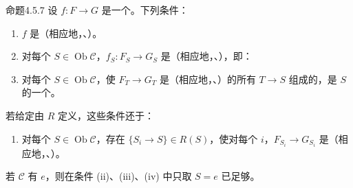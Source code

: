 \begin{SGAresult}{命题}{4.5.7}
设 $f:F\to G$ 是一个。下列条件：
\begin{enumerate}
\item[(i)] $f$ 是（相应地，、）。
\item[(ii)] 对每个 $S\in\operatorname{Ob}\mathcal C$，$f_S:F_S\to G_S$ 是（相应地，、），即：
\item[(iii)] 对每个 $S\in\operatorname{Ob}\mathcal C$，使 $F_T\to G_T$ 是（相应地，、）的所有 $T\to S$ 组成的，是 $S$ 的一个。
\end{enumerate}
若给定由 $R$ 定义，这些条件还于：
\begin{enumerate}
\item[(iv)] 对每个 $S\in\operatorname{Ob}\mathcal C$，存在 $\{S_i\to S\}\in R(S)$，使对每个 $i$，$F_{S_i}\to G_{S_i}$ 是（相应地，、）。
\end{enumerate}
若 $\mathcal C$ 有 $e$，则在条件 (ii)、(iii)、(iv) 中只取 $S=e$ 已足够。
\end{SGAresult}
